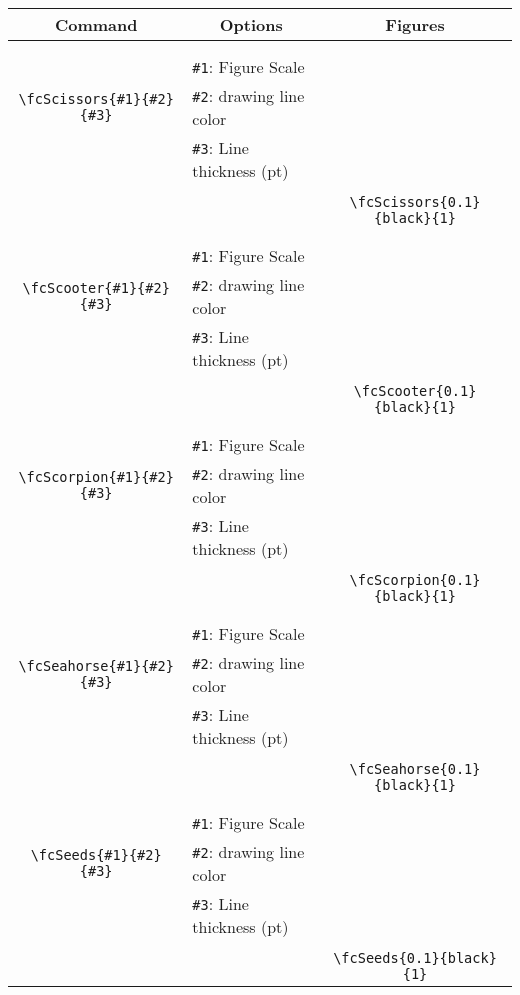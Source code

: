 \documentclass[x11names]{article}
\begin{document}
\begin{table}[H]\centering\begin{tabular}{|c|l|c|}\hline {\bf Command}& \multicolumn{1}{c|}{{\bf Options}} & {\bf Figures}\\  \hline	&&\multirow{5}{*}{\fcScissors{0.1}{black}{1}}\\	&&\\	&\verb|#1|: Figure Scale &\\	\verb|\fcScissors{#1}{#2}{#3}|&	\verb|#2|: drawing line color &\\	&\verb|#3|: Line thickness (pt) &\\ &&\\&&	\verb|\fcScissors{0.1}{black}{1}|\\\hline 	
	&&\multirow{5}{*}{\fcScooter{0.1}{black}{1}}\\	&&\\	&\verb|#1|: Figure Scale &\\	\verb|\fcScooter{#1}{#2}{#3}|&	\verb|#2|: drawing line color &\\	&\verb|#3|: Line thickness (pt) &\\ &&\\&&	\verb|\fcScooter{0.1}{black}{1}|\\\hline 	
	&&\multirow{5}{*}{\fcScorpion{0.1}{black}{1}}\\	&&\\	&\verb|#1|: Figure Scale &\\	\verb|\fcScorpion{#1}{#2}{#3}|&	\verb|#2|: drawing line color &\\	&\verb|#3|: Line thickness (pt) &\\ &&\\&&	\verb|\fcScorpion{0.1}{black}{1}|\\\hline 	
	&&\multirow{5}{*}{\fcSeahorse{0.1}{black}{1}}\\	&&\\	&\verb|#1|: Figure Scale &\\	\verb|\fcSeahorse{#1}{#2}{#3}|&	\verb|#2|: drawing line color &\\	&\verb|#3|: Line thickness (pt) &\\ &&\\&&	\verb|\fcSeahorse{0.1}{black}{1}|\\\hline 	
	&&\multirow{5}{*}{\fcSeeds{0.1}{black}{1}}\\	&&\\	&\verb|#1|: Figure Scale &\\	\verb|\fcSeeds{#1}{#2}{#3}|&	\verb|#2|: drawing line color &\\	&\verb|#3|: Line thickness (pt) &\\ &&\\&&	\verb|\fcSeeds{0.1}{black}{1}|\\\hline 	

\end{tabular}
\end{table}
\end{document}
